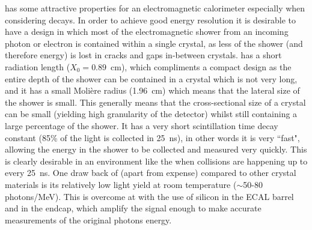 \PbWO has some attractive properties for an electromagnetic calorimeter especially when considering \Hgg decays. In order to achieve good energy resolution it is desirable to have a design in which most of the electromagnetic shower from an incoming photon or electron is contained within a single crystal, as less of the shower (and therefore energy) is lost in cracks and gaps in-between crystals. \PbWO has a short radiation length ($X_{0}=0.89$~cm), which compliments a compact design as the entire depth of the shower can be contained in a crystal which is not very long, and it has a small Moli\`{e}re radius (1.96~cm) which means that the lateral size of the shower is small. This generally means that the cross-sectional size of a crystal can be small (yielding high granularity of the detector) whilst still containing a large percentage of the shower. It has a very short scintillation time decay constant (85\% of the light is collected in 25~ns), in other words it is very ``fast", allowing the energy in the shower to be collected and measured very quickly. This is clearly desirable in an environment like the \LHC when collisions are happening up to every 25~ns. One draw back of \PbWO (apart from expense) compared to other crystal materials is its relatively low light yield at room temperature ($\sim$50-80 photons/MeV). This is overcome at \CMS with the use of silicon \APDs in the ECAL barrel and \VPTs in the endcap, which amplify the signal enough to make accurate measurements of the original photons energy. 
